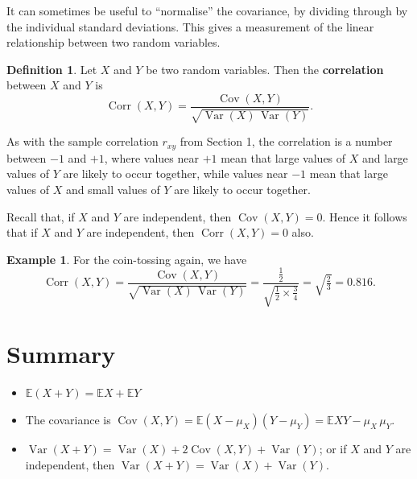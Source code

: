 \documentclass[
  a4paper,
]{book}
\providecommand{\tightlist}{%
  \setlength{\itemsep}{0pt}\setlength{\parskip}{0pt}}
\theoremstyle{definition}
\newtheorem{definition}{Definition}[chapter]
\theoremstyle{definition}
\newtheorem{example}{Example}[chapter]
\theoremstyle{definition}
\theoremstyle{definition}
\theoremstyle{remark}
\begin{document}
It can sometimes be useful to ``normalise'' the covariance, by dividing through by the individual standard deviations. This gives a measurement of the linear relationship between two random variables.

\begin{definition}
Let \(X\) and \(Y\) be two random variables. Then the \textbf{correlation} between \(X\) and \(Y\) is
\[ \operatorname{Corr}(X,Y) = \frac{\operatorname{Cov}(X,Y)} {\sqrt{\operatorname{Var}(X)\,\operatorname{Var}(Y)}} . \]
\end{definition}

As with the sample correlation \(r_{xy}\) from Section 1, the correlation is a number between \(-1\) and \(+1\), where values near \(+1\) mean that large values of \(X\) and large values of \(Y\) are likely to occur together, while values near \(-1\) mean that large values of \(X\) and small values of \(Y\) are likely to occur together.

Recall that, if \(X\) and \(Y\) are independent, then \(\operatorname{Cov}(X,Y) = 0\). Hence it follows that if \(X\) and \(Y\) are independent, then \(\operatorname{Corr}(X,Y) = 0\) also.

\begin{example}
For the coin-tossing again, we have
\[ \operatorname{Corr}(X,Y) = \frac{\operatorname{Cov}(X,Y)} {\sqrt{\operatorname{Var}(X)\,\operatorname{Var}(Y)}} = \frac{\frac12}{\sqrt{\frac12 \times \frac34}} = \sqrt{\tfrac23} = 0.816 .    \]
\end{example}

\hypertarget{summary-L14}{%
\section*{Summary}\label{summary-L14}}

\begin{itemize}
\tightlist
\item
  \(\mathbb E(X + Y) = \mathbb EX + \mathbb EY\)
\item
  The covariance is \(\operatorname{Cov}(X,Y) = \mathbb E(X - \mu_X)(Y - \mu_Y) = \mathbb EXY - \mu_X \,\mu_Y\).
\item
  \(\operatorname{Var}(X + Y) = \operatorname{Var}(X) + 2\operatorname{Cov}(X,Y) + \operatorname{Var}(Y)\); or if \(X\) and \(Y\) are independent, then \(\operatorname{Var}(X + Y) = \operatorname{Var}(X) + \operatorname{Var}(Y)\).
\end{itemize}
\end{document}
